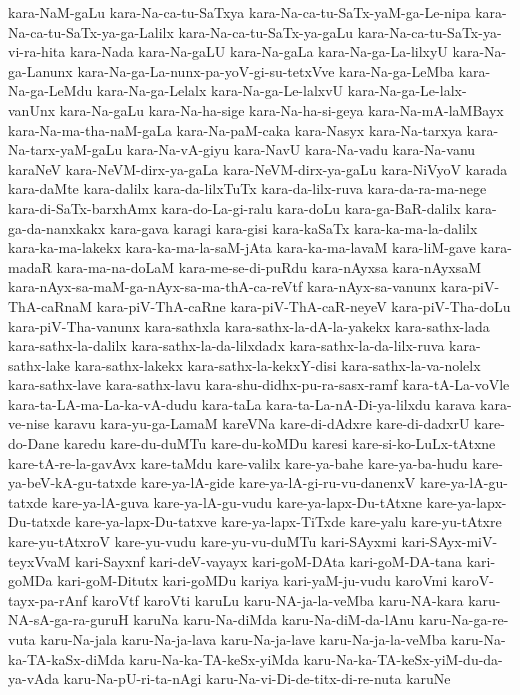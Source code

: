 {kara-NaM-gaLu
kara-Na-ca-tu-SaTxya
kara-Na-ca-tu-SaTx-yaM-ga-Le-nipa
kara-Na-ca-tu-SaTx-ya-ga-Lalilx
kara-Na-ca-tu-SaTx-ya-gaLu
kara-Na-ca-tu-SaTx-ya-vi-ra-hita
kara-Nada
kara-Na-gaLU
kara-Na-gaLa
kara-Na-ga-La-lilxyU
kara-Na-ga-Lanunx
kara-Na-ga-La-nunx-pa-yoV-gi-su-tetxVve
kara-Na-ga-LeMba
kara-Na-ga-LeMdu
kara-Na-ga-Lelalx
kara-Na-ga-Le-lalxvU
kara-Na-ga-Le-lalx-vanUnx
kara-Na-gaLu
kara-Na-ha-sige
kara-Na-ha-si-geya
kara-Na-mA-laMBayx
kara-Na-ma-tha-naM-gaLa
kara-Na-paM-caka
kara-Nasyx
kara-Na-tarxya
kara-Na-tarx-yaM-gaLu
kara-Na-vA-giyu
kara-NavU
kara-Na-vadu
kara-Na-vanu
karaNeV
kara-NeVM-dirx-ya-gaLa
kara-NeVM-dirx-ya-gaLu
kara-NiVyoV
karada
kara-daMte
kara-dalilx
kara-da-lilxTuTx
kara-da-lilx-ruva
kara-da-ra-ma-nege
kara-di-SaTx-barxhAmx
kara-do-La-gi-ralu
kara-doLu
kara-ga-BaR-dalilx
kara-ga-da-nanxkakx
kara-gava
karagi
kara-gisi
kara-kaSaTx
kara-ka-ma-la-dalilx
kara-ka-ma-lakekx
kara-ka-ma-la-saM-jAta
kara-ka-ma-lavaM
kara-liM-gave
kara-madaR
kara-ma-na-doLaM
kara-me-se-di-puRdu
kara-nAyxsa
kara-nAyxsaM
kara-nAyx-sa-maM-ga-nAyx-sa-ma-thA-ca-reVtf
kara-nAyx-sa-vanunx
kara-piV-ThA-caRnaM
kara-piV-ThA-caRne
kara-piV-ThA-caR-neyeV
kara-piV-Tha-doLu
kara-piV-Tha-vanunx
kara-sathxla
kara-sathx-la-dA-la-yakekx
kara-sathx-lada
kara-sathx-la-dalilx
kara-sathx-la-da-lilxdadx
kara-sathx-la-da-lilx-ruva
kara-sathx-lake
kara-sathx-lakekx
kara-sathx-la-kekxY-disi
kara-sathx-la-va-nolelx
kara-sathx-lave
kara-sathx-lavu
kara-shu-didhx-pu-ra-sasx-ramf
kara-tA-La-voVle
kara-ta-LA-ma-La-ka-vA-dudu
kara-taLa
kara-ta-La-nA-Di-ya-lilxdu
karava
kara-ve-nise
karavu
kara-yu-ga-LamaM
kareVNa
kare-di-dAdxre
kare-di-dadxrU
kare-do-Dane
karedu
kare-du-duMTu
kare-du-koMDu
karesi
kare-si-ko-LuLx-tAtxne
kare-tA-re-la-gavAvx
kare-taMdu
kare-valilx
kare-ya-bahe
kare-ya-ba-hudu
kare-ya-beV-kA-gu-tatxde
kare-ya-lA-gide
kare-ya-lA-gi-ru-vu-danenxV
kare-ya-lA-gu-tatxde
kare-ya-lA-guva
kare-ya-lA-gu-vudu
kare-ya-lapx-Du-tAtxne
kare-ya-lapx-Du-tatxde
kare-ya-lapx-Du-tatxve
kare-ya-lapx-TiTxde
kare-yalu
kare-yu-tAtxre
kare-yu-tAtxroV
kare-yu-vudu
kare-yu-vu-duMTu
kari-SAyxmi
kari-SAyx-miV-teyxVvaM
kari-Sayxnf
kari-deV-vayayx
kari-goM-DAta
kari-goM-DA-tana
kari-goMDa
kari-goM-Ditutx
kari-goMDu
kariya
kari-yaM-ju-vudu
karoVmi
karoV-tayx-pa-rAnf
karoVtf
karoVti
karuLu
karu-NA-ja-la-veMba
karu-NA-kara
karu-NA-sA-ga-ra-guruH
karuNa
karu-Na-diMda
karu-Na-diM-da-lAnu
karu-Na-ga-re-vuta
karu-Na-jala
karu-Na-ja-lava
karu-Na-ja-lave
karu-Na-ja-la-veMba
karu-Na-ka-TA-kaSx-diMda
karu-Na-ka-TA-keSx-yiMda
karu-Na-ka-TA-keSx-yiM-du-da-ya-vAda
karu-Na-pU-ri-ta-nAgi
karu-Na-vi-Di-de-titx-di-re-nuta
karuNe
}
